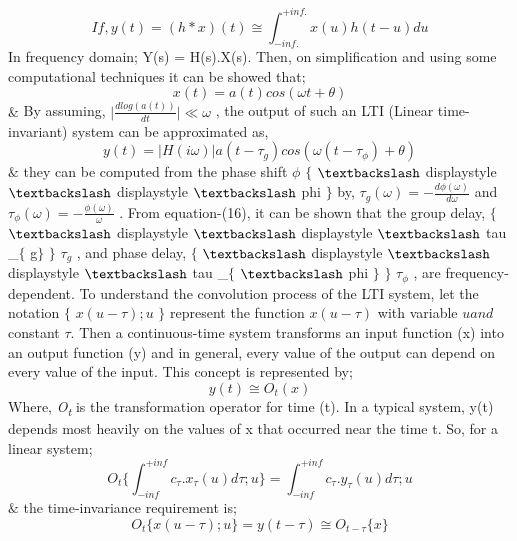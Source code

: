 \begin{equation}\tag{6.6}
If, y(t) = ( h\ast x)(t) \cong \int _{-inf.}^{+inf.}x(u)h(t-u)du
\end{equation}
In frequency domain; Y(s) = H(s).X(s). Then, on simplification and using some computational techniques it can be showed that;
\begin{equation}\tag{6.7}
x(t) =a(t) cos(\omega t+ \theta)
\end{equation}
$\&$  By assuming,  \(  \vert \frac{dlog(a(t))}{dt} \vert  \ll  \omega  \) , the output of such an LTI (Linear time-invariant) system can be approximated as,
\begin{equation}\tag{6.8}
y(t)=|H(i\omega)|a(t-\tau_g)cos(\omega(t-\tau_{\phi})+\theta)
\end{equation}
$\&$  they can be computed from the phase shift  \(  \phi  \)  $ \{ $ $\textbackslash$ displaystyle $\textbackslash$ displaystyle $\textbackslash$ phi $ \} $  by,  \(  \tau_{g} (  \omega  ) =-\frac{d \phi  (  \omega  ) }{d \omega } \)  and  \(  \tau_{ \phi } (  \omega  ) =-\frac{ \phi  (  \omega  ) }{ \omega } \) . From equation-(16), it can be shown that the group delay, $ \{ $ $\textbackslash$ displaystyle $\textbackslash$ displaystyle $\textbackslash$ tau \_$ \{ $ g$ \} $ $ \} $  \(  \tau_{g} \) , and phase delay, $ \{ $ $\textbackslash$ displaystyle $\textbackslash$ displaystyle $\textbackslash$ tau \_$ \{ $ $\textbackslash$ phi $ \} $ $ \} $  \(  \tau_{ \phi } \) , are frequency-dependent. To understand the convolution process of the LTI system, let the notation $ \{ $  \( x ( u- \tau ) ;u \) $ \} $  represent the function  \( x ( u- \tau )  \)  with variable \(  u and \)  constant  \(  \tau. \)  Then a continuous-time system transforms an input function (x) into an output function (y) and in general, every value of the output can depend on every value of the input. This concept is represented by;
\begin{equation}\tag{6.9}
y ( t ) \cong O_{t} ( x )
\end{equation}
Where, \textit{O\textsubscript{t }}is the transformation operator for time (t). In a typical system, y(t) depends most heavily on the values of x that occurred near the time t. So, for a linear system;
\begin{equation}\tag{6.10}
O_t\{\int_{-inf}^{+inf}c_{\tau}.x_{\tau}(u)d\tau;u\}=\int_{-inf}^{+inf}c_{\tau}.y_{\tau}(u)d\tau;u
\end{equation}
$\&$  the time-invariance requirement is;
\begin{equation}\tag{6.11}
O_t\{x(u-\tau);u\}=y(t-\tau)\cong O_{t-\tau}\{x\}
\end{equation}
